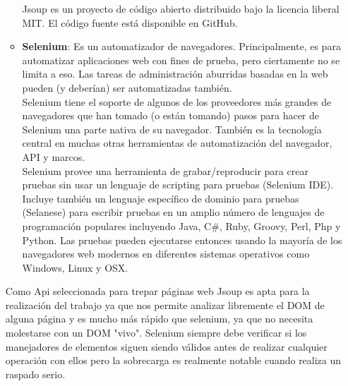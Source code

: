 \begin{itemize}
\begin{itemize}
				Jsoup es un proyecto de código abierto distribuido bajo la licencia liberal MIT. El código fuente está disponible en GitHub.\cite{jsoup}
				
				\item \textbf{Selenium}: Es un automatizador de navegadores. Principalmente, es para automatizar aplicaciones web con fines de prueba, pero ciertamente no se limita a eso. Las tareas de administración aburridas basadas en la web pueden (y deberían) ser automatizadas también.\\
				
				Selenium tiene el soporte de algunos de los proveedores más grandes de navegadores que han tomado (o están tomando) pasos para hacer de Selenium una parte nativa de su navegador. También es la tecnología central en muchas otras herramientas de automatización del navegador, API y marcos.\\
				
				Selenium provee una herramienta de grabar/reproducir para crear pruebas sin usar un lenguaje de scripting para pruebas (Selenium IDE). Incluye también un lenguaje específico de dominio para pruebas (Selanese) para escribir pruebas en un amplio número de lenguajes de programación populares incluyendo Java, C#, Ruby, Groovy, Perl, Php y Python. Las pruebas pueden ejecutarse entonces usando la mayoría de los navegadores web modernos en diferentes sistemas operativos como Windows, Linux y OSX.
				
			\end{itemize}
		Como Api seleccionada para trepar páginas web Jsoup es apta para la realización del trabajo ya que nos permite analizar libremente el DOM de alguna página y es mucho más rápido que selenium, ya que no necesita molestarse con un DOM "vivo". Selenium siempre debe verificar si los manejadores de elementos siguen siendo válidos antes de realizar cualquier operación con ellos pero la sobrecarga es realmente notable cuando realiza un raspado serio. \\
			
	\end{itemize}
	

